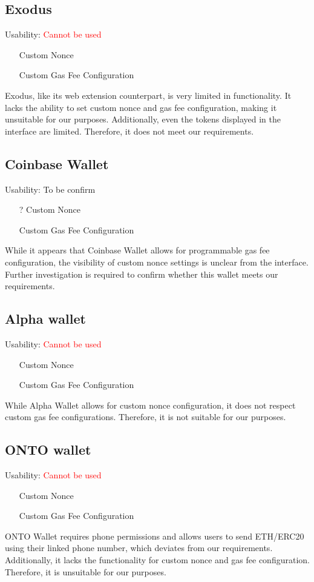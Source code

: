 \documentclass[fleqn,10pt]{olplainarticle}
\newcommand{\cmark}{\ding{51}}%
\newcommand{\xmark}{\ding{55}}%
\begin{document}
\subsection{Exodus}
Usability: \textcolor{red}{Cannot be used}
\begin{itemize}[noitemsep, nolistsep]
	\item [\textcolor{red}{\xmark}] Custom Nonce
	\item [\textcolor{red}{\xmark}] Custom Gas Fee Configuration
\end{itemize}
Exodus, like its web extension counterpart, is very limited in functionality. It lacks the ability to set custom nonce and gas fee configuration, making it unsuitable for our purposes. Additionally, even the tokens displayed in the interface are limited. Therefore, it does not meet our requirements.

\subsection{Coinbase Wallet}
Usability: To be confirm
\begin{itemize}[noitemsep, nolistsep]
	\item [?] Custom Nonce
	\item [\textcolor{green}{\cmark}] Custom Gas Fee Configuration
\end{itemize}
While it appears that Coinbase Wallet allows for programmable gas fee configuration, the visibility of custom nonce settings is unclear from the interface. Further investigation is required to confirm whether this wallet meets our requirements.

\subsection{Alpha wallet}
Usability: \textcolor{red}{Cannot be used}
\begin{itemize}[noitemsep, nolistsep]
	\item [\textcolor{green}{\cmark}] Custom Nonce
	\item [\textcolor{red}{\xmark}] Custom Gas Fee Configuration
\end{itemize}
While Alpha Wallet allows for custom nonce configuration, it does not respect custom gas fee configurations. Therefore, it is not suitable for our purposes.

\subsection{ONTO wallet}
Usability: \textcolor{red}{Cannot be used}
\begin{itemize}[noitemsep, nolistsep]
	\item [\textcolor{red}{\xmark}] Custom Nonce
	\item [\textcolor{red}{\xmark}] Custom Gas Fee Configuration
\end{itemize}
ONTO Wallet requires phone permissions and allows users to send ETH/ERC20 using their linked phone number, which deviates from our requirements. Additionally, it lacks the functionality for custom nonce and gas fee configuration. Therefore, it is unsuitable for our purposes.
\end{document}

